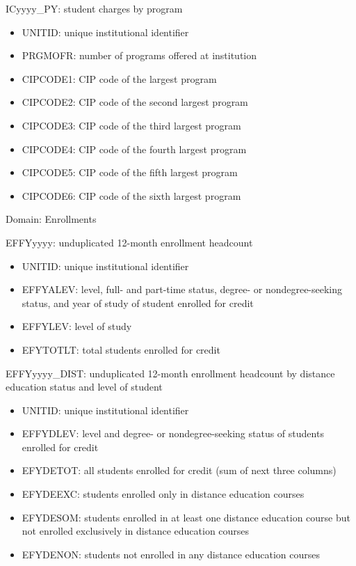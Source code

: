 \documentclass[sigconf, authorversion, nonacm]{acmart}
\begin{document}
    ICyyyy\_PY: student charges by program

    \begin{itemize}
        \item UNITID: unique institutional identifier
        \item PRGMOFR: number of programs offered at institution
        \item CIPCODE1: CIP code of the largest program
        \item CIPCODE2: CIP code of the second largest program
        \item CIPCODE3: CIP code of the third largest program
        \item CIPCODE4: CIP code of the fourth largest program
        \item CIPCODE5: CIP code of the fifth largest program
        \item CIPCODE6: CIP code of the sixth largest program
    \end{itemize}

    Domain: Enrollments

    EFFYyyyy: unduplicated 12-month enrollment headcount

    \begin{itemize}
        \item UNITID: unique institutional identifier
        \item EFFYALEV: level, full- and part-time status, degree- or nondegree-seeking status, and year of study of student enrolled for credit
        \item EFFYLEV: level of study
        \item EFYTOTLT: total students enrolled for credit
    \end{itemize}

    EFFYyyyy\_DIST: unduplicated 12-month enrollment headcount by distance education status and level of student

    \begin{itemize}
        \item UNITID: unique institutional identifier
        \item EFFYDLEV: level and degree- or nondegree-seeking status of students enrolled for credit
        \item EFYDETOT: all students enrolled for credit (sum of next three columns)
        \item EFYDEEXC: students enrolled only in distance education courses
        \item EFYDESOM: students enrolled in at least one distance education course but not enrolled exclusively in distance education courses
        \item EFYDENON: students not enrolled in any distance education courses
    \end{itemize}
\end{document}
